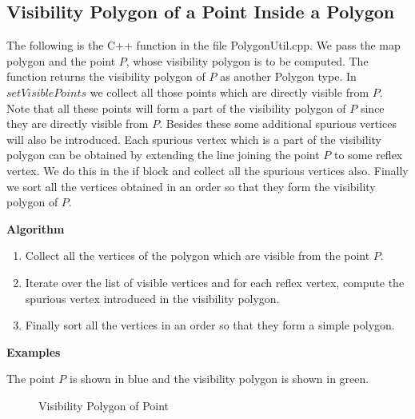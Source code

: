 \subsection{Visibility Polygon of a Point Inside a Polygon}

The following is the C++ function in the file PolygonUtil.cpp. We pass the map polygon and the point $P$, whose visibility polygon is to be
 computed. The function returns the visibility polygon of $P$ as another Polygon type.
In $setVisiblePoints$ we collect all those points which are directly visible from $P$. Note that
 all these points will form a part of the visibility polygon of $P$ since they are directly visible from $P$. 
Besides these some additional spurious vertices will also be introduced. Each spurious vertex which is a part of the visibility polygon
 can be obtained by extending the line joining the point $P$ to some reflex vertex. We do this in the if block and collect all the 
spurious vertices also. Finally we sort all the vertices obtained in an order so that they form the visibility polygon of $P$.



{\bf Algorithm}

\begin{enumerate}
 \item 
Collect all the vertices of the polygon which are visible from the point $P$.
\item
Iterate over the list of visible vertices and for each reflex vertex, compute the spurious vertex introduced in the visibility polygon.
\item
Finally sort all the vertices in an order so that they form a simple polygon.
\end{enumerate}

{\bf Examples}

The point $P$ is shown in blue and the visibility polygon is shown in green.

\begin{figure}[h]
\begin{center}
\caption{\label{fig:Visibility Polygon of Point}Visibility Polygon of Point}
\end{center}
\end{figure}


